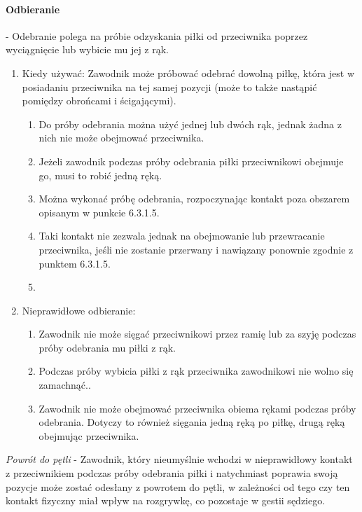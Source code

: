 \documentclass[12pt]{article}
\begin{document}
\paragraph{Odbieranie} - Odebranie polega na próbie odzyskania
piłki od przeciwnika poprzez wyciągnięcie lub wybicie mu jej z rąk.

\begin{enumerate}
	\item
	      Kiedy używać: Zawodnik może próbować odebrać dowolną piłkę, która jest
	      w posiadaniu przeciwnika na tej samej pozycji (może to także nastąpić
	      pomiędzy obrońcami i ścigającymi).

	      \begin{enumerate}
		      \item
		            Do próby odebrania można użyć jednej lub dwóch rąk, jednak żadna z
		            nich nie może obejmować przeciwnika.
		      \item
		            Jeżeli zawodnik podczas próby odebrania piłki przeciwnikowi obejmuje
		            go, musi to robić jedną ręką.
		      \item
		            Można wykonać próbę odebrania, rozpoczynając kontakt poza obszarem
		            opisanym w punkcie 6.3.1.5.\item Taki kontakt nie zezwala jednak na
		            obejmowanie lub przewracanie przeciwnika, jeśli nie zostanie
		            przerwany i nawiązany ponownie zgodnie z punktem 6.3.1.5.\item
	      \end{enumerate}
	\item
	      Nieprawidłowe odbieranie:

	      \begin{enumerate}
		      \item
		            Zawodnik nie może sięgać przeciwnikowi przez ramię lub za szyję
		            podczas próby odebrania mu piłki z rąk.
		      \item
		            Podczas próby wybicia piłki z rąk przeciwnika zawodnikowi nie wolno
		            się zamachnąć..
		      \item
		            Zawodnik nie może obejmować przeciwnika obiema rękami podczas próby
		            odebrania. Dotyczy to również sięgania jedną ręką po piłkę, drugą
		            ręką obejmując przeciwnika.
	      \end{enumerate}
\end{enumerate}

\emph{Powrót do pętli} - Zawodnik, który nieumyślnie wchodzi w
nieprawidłowy kontakt z przeciwnikiem podczas próby odebrania piłki i
natychmiast poprawia swoją pozycje może zostać odesłany z powrotem do
pętli, w zależności od tego czy ten kontakt fizyczny miał wpływ na
rozgrywkę, co pozostaje w gestii sędziego.
\end{document}
